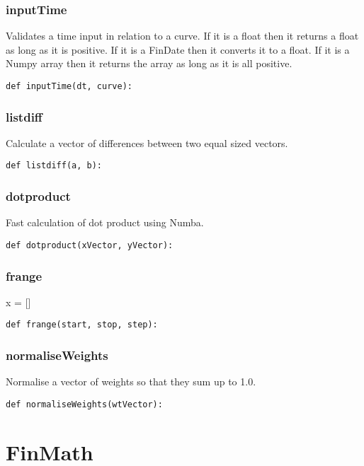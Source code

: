\documentclass[twoside,11pt]{book}
\begin{document}
\subsubsection*{{\bf inputTime}}
Validates a time input in relation to a curve. If it is a float then it returns a float as long as it is positive. If it is a FinDate then it converts it to a float. If it is a Numpy array then it returns the array as long as it is all positive.  

\begin{lstlisting}
def inputTime(dt, curve):
\end{lstlisting}

\subsubsection*{{\bf listdiff}}
Calculate a vector of differences between two equal sized vectors.  

\begin{lstlisting}
def listdiff(a, b):
\end{lstlisting}

\subsubsection*{{\bf dotproduct}}
Fast calculation of dot product using Numba.  

\begin{lstlisting}
def dotproduct(xVector, yVector):
\end{lstlisting}

\subsubsection*{{\bf frange}}
x = [] 

\begin{lstlisting}
def frange(start, stop, step):
\end{lstlisting}

\subsubsection*{{\bf normaliseWeights}}
Normalise a vector of weights so that they sum up to 1.0.  

\begin{lstlisting}
def normaliseWeights(wtVector):
\end{lstlisting}

\newpage
\section{FinMath}
\end{document}
